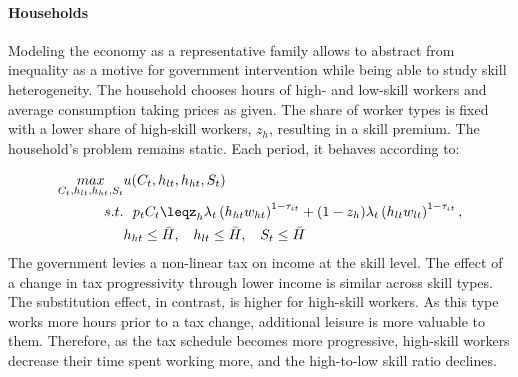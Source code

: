 \paragraph{Households}
Modeling the economy as a representative family allows to abstract from inequality as a motive for government intervention while being able to study skill heterogeneity.
 The household chooses hours of high- and low-skill workers and average consumption taking prices as given. The share of worker types is fixed with a lower share of high-skill workers, $z_h$, resulting in a skill premium. The household's problem remains static. Each period, it behaves according to: %

\begin{align}
\underset{C_{t}, h_{lt}, h_{ht}, S_t}{max}&
u(C_{t}, h_{lt}, h_{ht}, S_t)\\
s.t.& \ \ p_{t}C_{t}\leq%
z_h\lambda_t \left(h_{ht}w_{ht}\right)^{1-\tau_{\iota t}}+(1-z_h)\lambda_t\left(h_{lt}w_{lt}\right)^{1-\tau_{\iota t}},\\ %
\ & h_{ht}\leq \bar{H},\ \hspace{2mm} h_{lt}\leq \bar{H},\ \hspace{2mm}  S_{t}\leq \bar{H}
\end{align}
The government levies a non-linear tax on income at the skill level. 
The effect of a change in tax progressivity through lower income is similar across skill types. The substitution effect, in contrast, is higher for high-skill workers. As this type works more hours prior to a tax change, additional leisure is more valuable to them. Therefore, as the tax schedule becomes more progressive, high-skill workers decrease their time spent working more, and the high-to-low skill ratio declines. 


